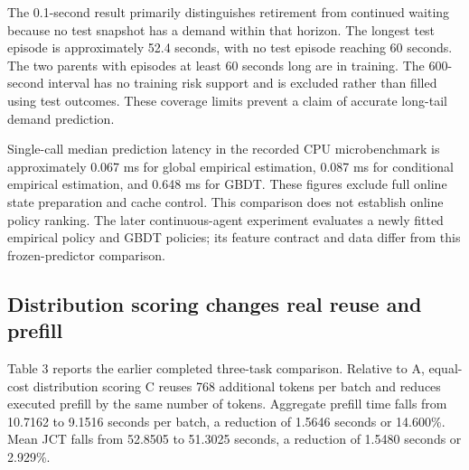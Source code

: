 \documentclass[sigconf, screen, review]{acmart}
\begin{document}
The 0.1-second result primarily distinguishes retirement from continued
waiting because no test snapshot has a demand within that horizon. The
longest test episode is approximately 52.4 seconds, with no test episode
reaching 60 seconds. The two parents with episodes at least 60 seconds
long are in training. The 600-second interval has no training risk
support and is excluded rather than filled using test outcomes. These
coverage limits prevent a claim of accurate long-tail demand prediction.

Single-call median prediction latency in the recorded CPU microbenchmark
is approximately 0.067 ms for global empirical estimation, 0.087 ms for
conditional empirical estimation, and 0.648 ms for GBDT. These figures
exclude full online state preparation and cache control. This comparison does not establish online policy ranking. The later
continuous-agent experiment evaluates a newly fitted empirical policy
and GBDT policies; its feature contract and data differ from this
frozen-predictor comparison.

\subsection{Distribution scoring changes real reuse and
prefill}\label{distribution-scoring-changes-real-reuse-and-prefill}

Table 3 reports the earlier completed three-task comparison. Relative to A,
equal-cost distribution scoring C reuses 768 additional tokens per batch
and reduces executed prefill by the same number of tokens. Aggregate
prefill time falls from 10.7162 to 9.1516 seconds per batch, a reduction
of 1.5646 seconds or 14.600\%. Mean JCT falls from 52.8505 to 51.3025
seconds, a reduction of 1.5480 seconds or 2.929\%.
\end{document}

